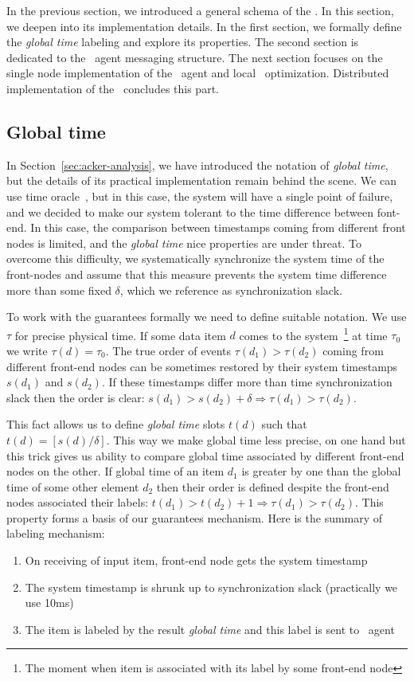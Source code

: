 \label {fs-acker-impl}

In the previous section, we introduced a general schema of the \tracker. In this section, we deepen into its implementation details. In the first section, we formally define the \textit{global time} labeling and explore its properties. The second section is dedicated to the \tracker\ agent messaging structure. The next section focuses on the single node implementation of the \tracker\ agent and local \tracker\ optimization. Distributed implementation of the \tracker\ concludes this part.

\subsection{Global time}
In Section~\ref{sec:acker-analysis}, we have introduced the notation of \textit{global time}, but the details of its practical implementation remain behind the scene. We can use time oracle~\cite{10.14778/3055330.3055335}, but in this case, the system will have a single point of failure, and we decided to make our system tolerant to the time difference between font-end. In this case, the comparison between timestamps coming from different front nodes is limited, and the \textit{global time} nice properties are under threat. To overcome this difficulty, we systematically synchronize the system time of the front-nodes and assume that this measure prevents the system time difference more than some fixed $\delta$, which we reference as synchronization slack.

To work with the guarantees formally we need to define suitable notation. We use $\tau$ for precise physical time. If some data item $d$ comes to the system~\footnote{The moment when item is associated with its label by some front-end node} at time $\tau_0$ we write $\tau(d)=\tau_0$. The true order of events $\tau(d_1) > \tau(d_2)$ coming from different front-end nodes can be sometimes restored by their system timestamps $s(d_1)$ and $s(d_2)$. If these timestamps differ more than time synchronization slack then the order is clear: $s(d_1) > s(d_2) + \delta \Rightarrow \tau(d_1) > \tau(d_2)$.

This fact allows us to define \textit{global time} slots $t(d)$ such that $t(d) = [s(d) / \delta]$. This way we make global time less precise,  on one hand but this trick gives us ability to compare global time associated by different front-end nodes on the other. If global time of an item $d_1$ is greater by one than the global time of some other element $d_2$ then their order is defined despite the front-end nodes associated their labels:  $t(d_1) > t(d_2) + 1 \Rightarrow \tau(d_1) > \tau(d_2)$. This property forms a basis of our guarantees mechanism. Here is the summary of labeling mechanism:
\begin{enumerate}
    \item On receiving of input item, front-end node gets the system timestamp
    \item The system timestamp is shrunk up to synchronization slack (practically we use 10ms)
    \item The item is labeled by the result \textit{global time} and this label is sent to \tracker\ agent
\end{enumerate}

